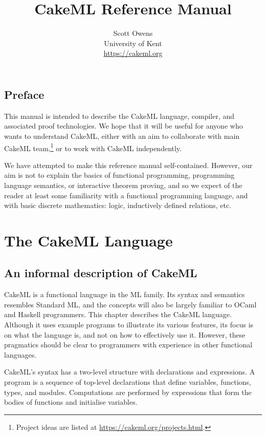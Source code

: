 \documentclass[12pt,a4paper]{book}
\title{CakeML Reference Manual}
\author{Scott Owens\\
University of Kent\\
\url{https://cakeml.org}
}
\begin{document}
\sloppy
\maketitle
\frenchspacing

\frontmatter

\chapter{Preface}

This manual is intended to describe the CakeML language, compiler, and associated proof technologies. We hope that it will be useful for anyone who wants to understand  CakeML, either with an aim to collaborate with main CakeML team,\footnote{Project ideas are listed at \url{https://cakeml.org/projects.html}.}
or to work with CakeML independently.

We have attempted to make this reference manual self-contained. However, our aim is not to explain the basics of functional programming, programming language semantics, or interactive theorem proving, and so we expect of the reader at least some familiarity with a functional programming language, and with basic discrete mathematics: logic, inductively defined relations, etc.

\mainmatter
\tableofcontents


\part{The CakeML Language}
\label{part:lang}

\chapter{An informal description of CakeML}

CakeML is a functional language in the ML family. Its syntax and semantics
resembles Standard ML, and the concepts will also be largely familiar
to OCaml and Haskell programmers. This chapter describes the CakeML language.
Although it uses example programs to illustrate its various features, its focus
is on what the language is, and not on how to effectively use it. However,
these pragmatics should be clear to programmers with experience in other
functional languages.

CakeML's syntax has a two-level structure with declarations and expressions. A
program is a sequence of top-level declarations that define variables,
functions, types, and modules. Computations are performed by expressions that form the bodies of functions and initialise variables.
\end{document}

